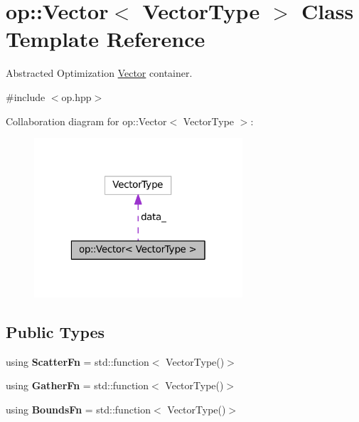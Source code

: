 \hypertarget{classop_1_1Vector}{\section{op\-:\-:Vector$<$ Vector\-Type $>$ Class Template Reference}
\label{classop_1_1Vector}
}


Abstracted Optimization \hyperlink{classop_1_1Vector}{Vector} container.  




{\ttfamily \#include $<$op.\-hpp$>$}



Collaboration diagram for op\-:\-:Vector$<$ Vector\-Type $>$\-:
\nopagebreak
\begin{figure}[H]
\begin{center}
\leavevmode
\includegraphics[width=220pt]{classop_1_1Vector__coll__graph}
\end{center}
\end{figure}
\subsection*{Public Types}
\begin{DoxyCompactItemize}
\item 
\hypertarget{classop_1_1Vector_ac28861996fd125f672dec63c9ec06c06}{using {\bfseries Scatter\-Fn} = std\-::function$<$ Vector\-Type()$>$}\label{classop_1_1Vector_ac28861996fd125f672dec63c9ec06c06}

\item 
\hypertarget{classop_1_1Vector_a99ef6a5d87839899f1daad6622a2e2fe}{using {\bfseries Gather\-Fn} = std\-::function$<$ Vector\-Type()$>$}\label{classop_1_1Vector_a99ef6a5d87839899f1daad6622a2e2fe}

\item 
\hypertarget{classop_1_1Vector_a00e1218c6eecc4290b4cda06f494ac84}{using {\bfseries Bounds\-Fn} = std\-::function$<$ Vector\-Type()$>$}\label{classop_1_1Vector_a00e1218c6eecc4290b4cda06f494ac84}

\end{DoxyCompactItemize}
